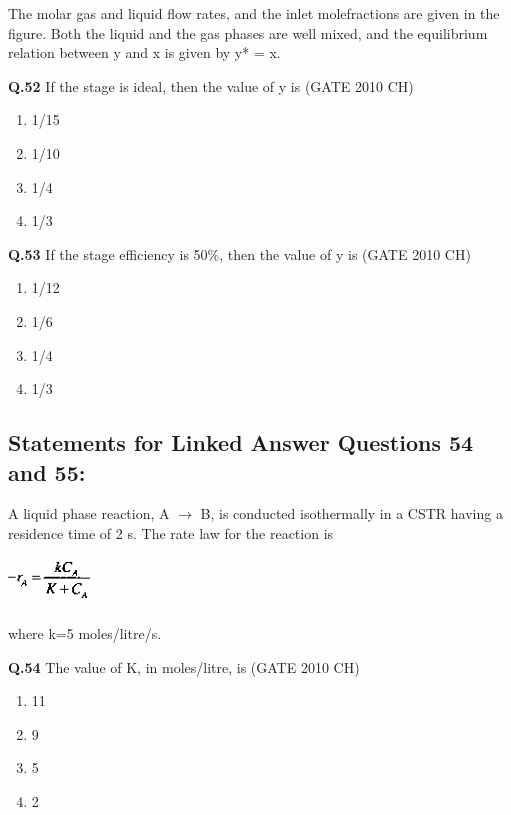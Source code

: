 \documentclass[journal,12pt,onecolumn]{exam}
\theoremstyle{remark}
\begin{document}
  The molar gas and liquid flow rates, and the inlet molefractions are given in the figure. Both the liquid and the gas phases are well mixed, and the equilibrium relation between y and x is given by y* = x.

  \noindent
  \textbf{Q.52}
   If the stage is ideal, then the value of y is
   \hfill{(GATE 2010 CH)}\\
   
 \begin{enumerate}
     \item 1/15
     \item 1/10
     \item 1/4
     \item 1/3
 \end{enumerate}

\noindent
  \textbf{Q.53}
  If the stage efficiency is 50\%, then the value of y is
  \hfill{(GATE 2010 CH)}\\

\begin{enumerate}
    \item 1/12
    \item 1/6
    \item 1/4
    \item 1/3
\end{enumerate}

\subsection{ Statements for Linked Answer Questions 54 and 55:} 

 A liquid phase reaction, A $\rightarrow $ B, is conducted isothermally in a CSTR having a residence time of 2 s. The rate law for the reaction is  


    \includegraphics[width=0.25\linewidth]{images/Q.54 image.png}
   
 where k=5 moles/litre/s.
     
\noindent
\textbf{Q.54}
 The value of K, in moles/litre, is
\hfill{(GATE 2010 CH)}\\

\begin{enumerate}
    \item 11
    \item 9
    \item 5
    \item 2
    
\end{enumerate}
\end{document}
